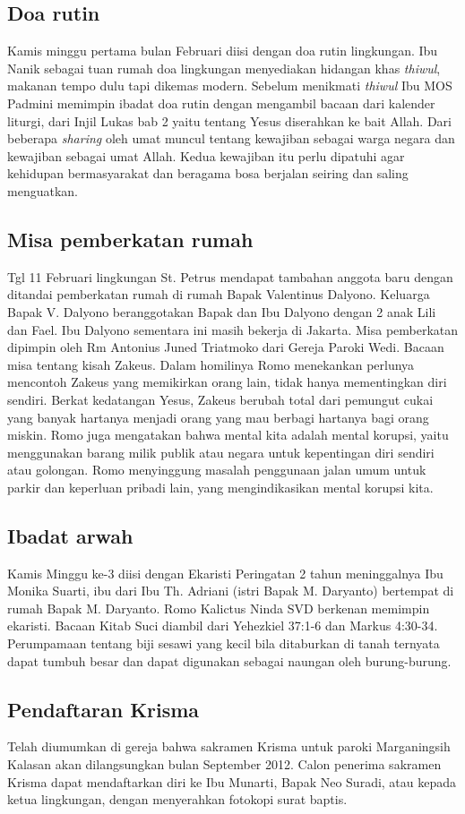 
\subsection*{Doa rutin}
Kamis minggu pertama bulan Februari diisi dengan doa rutin lingkungan. Ibu Nanik sebagai tuan rumah doa lingkungan menyediakan hidangan khas \textit{thiwul}, makanan tempo dulu tapi dikemas modern. Sebelum menikmati \textit{thiwul} Ibu MOS Padmini memimpin ibadat doa rutin dengan mengambil bacaan dari kalender liturgi, dari Injil Lukas bab 2 yaitu tentang Yesus diserahkan ke bait Allah. Dari beberapa \textit{sharing} oleh umat muncul tentang kewajiban sebagai warga negara dan kewajiban sebagai umat Allah. Kedua kewajiban itu perlu dipatuhi agar kehidupan bermasyarakat dan beragama bosa berjalan seiring dan saling menguatkan.

\subsection*{Misa pemberkatan rumah}
Tgl 11 Februari lingkungan St. Petrus mendapat tambahan anggota baru dengan ditandai pemberkatan rumah di rumah Bapak Valentinus Dalyono. Keluarga Bapak V. Dalyono beranggotakan Bapak dan Ibu Dalyono dengan 2 anak Lili dan Fael. Ibu Dalyono sementara ini masih bekerja di Jakarta. Misa pemberkatan dipimpin oleh Rm Antonius Juned Triatmoko dari Gereja Paroki Wedi. Bacaan misa tentang kisah Zakeus. Dalam homilinya Romo menekankan perlunya mencontoh Zakeus yang memikirkan orang lain, tidak hanya mementingkan diri sendiri. Berkat kedatangan Yesus, Zakeus berubah total dari pemungut cukai yang banyak hartanya menjadi orang yang mau berbagi hartanya bagi orang miskin.
Romo juga mengatakan bahwa mental kita adalah mental korupsi, yaitu menggunakan barang milik publik atau negara untuk kepentingan diri sendiri atau golongan. Romo menyinggung masalah penggunaan jalan umum untuk parkir dan keperluan pribadi lain, yang mengindikasikan mental korupsi kita.

\subsection*{Ibadat arwah}
Kamis Minggu ke-3 diisi dengan Ekaristi Peringatan 2 tahun meninggalnya Ibu Monika Suarti, ibu dari Ibu Th. Adriani (istri Bapak M. Daryanto) bertempat di rumah Bapak M. Daryanto. Romo Kalictus Ninda SVD berkenan memimpin ekaristi. Bacaan Kitab Suci diambil dari Yehezkiel 37:1-6 dan Markus 4:30-34. Perumpamaan tentang biji sesawi yang kecil bila ditaburkan di tanah ternyata dapat tumbuh besar dan dapat digunakan sebagai naungan oleh burung-burung.

\subsection*{Pendaftaran Krisma}
Telah diumumkan di gereja bahwa sakramen Krisma untuk paroki Marganingsih Kalasan akan dilangsungkan bulan September 2012. Calon penerima sakramen Krisma dapat mendaftarkan diri ke Ibu Munarti, Bapak Neo Suradi, atau kepada ketua lingkungan, dengan menyerahkan fotokopi surat baptis.
